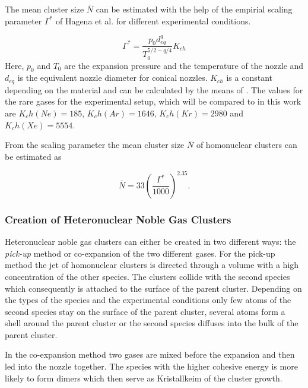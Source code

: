 \begin{figure}[h]
  \centering
  \caption{}
  \label{}
\end{figure}

The mean cluster size $\bar{N}$ can be estimated with
the help of the empirial scaling parameter $\Gamma^*$ of Hagena et al.
\cite{Hagena} for different experimental conditions.

\begin{equation}
 \Gamma^* = \frac{p_0 d_{eq}^q}{T_0^{5/2-q/4}} K_{ch}
\end{equation}
Here, $p_0$ and $T_0$ are the expansion pressure and the temperature
of the nozzle and $d_{eq}$ is the equivalent nozzle diameter for conical
nozzles. $K_{ch}$ is a constant depending on the material and can be
calculated by the means of \cite{xyz}. The values for the rare gases for
the experimental setup, which will be compared to in this work are
$K_ch(Ne)=185$, $K_ch(Ar)=1646$, $K_ch(Kr)=2980$ and $K_ch(Xe)=5554$.

From the scaling parameter the mean cluster size $\bar{N}$ 
of homonuclear clusters can be
estimated as

\begin{equation}
  \bar{N} = 33 \left( \frac{\Gamma^*}{1000} \right) ^{2.35} .
\end{equation}


\subsubsection{Creation of Heteronuclear Noble Gas Clusters}
Heteronuclear noble gas clusters can either be created in two different ways:
the \emph{pick-up} method or co-expansion of the two different gases.
For the pick-up method the jet of homonuclear clusters is directed through
a volume with a high concentration of the other species. The clusters
collide with the second species which consequently is attached to the surface
of the parent cluster. Depending on the types of the species
and the experimental conditions only few atoms
of the second species stay on the surface of the parent cluster,
several atoms form a shell around the parent cluster or the second species
diffuses into the bulk of the parent cluster.

In the co-expansion method two gases are mixed before the expansion and
then led into the nozzle together. The species with the higher cohesive
energy is more likely to form dimers which then serve as Kristallkeim of
the cluster growth.



